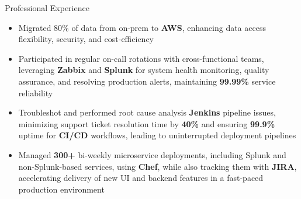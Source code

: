\documentclass{resume}
\begin{document}
\begin{experienceSection}{Professional Experience}
    \experienceItem[
        company={Cerner Healthcare (Oracle Health)},
        location={Bangalore, India},
        position={System Engineer - 1},
        duration={May 2021 - Jul 2023}
    ]
    \begin{itemize}
        \itemsep -6pt {}
        \item Migrated 80\% of data from on-prem to \textbf{AWS}, enhancing data access flexibility, security, and cost-efficiency
        \item Participated in regular on-call rotations with cross-functional teams, leveraging \textbf{Zabbix} and \textbf{Splunk} for system health monitoring, quality assurance, and resolving production alerts, maintaining \textbf{99.99\%} service reliability
        \item Troubleshot and performed root cause analysis \textbf{Jenkins} pipeline issues, minimizing support ticket resolution time by \textbf{40\%} and ensuring \textbf{99.9\%} uptime for \textbf{CI/CD} workflows, leading to uninterrupted deployment pipelines
        \item Managed \textbf{300+} bi-weekly microservice deployments, including Splunk and non-Splunk-based services, using \textbf{Chef}, while also tracking them with \textbf{JIRA}, accelerating delivery of new UI and backend features in a fast-paced production environment
    \end{itemize}

\end{experienceSection}
\end{document}
